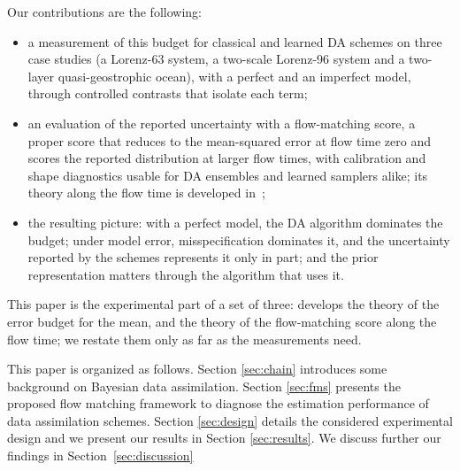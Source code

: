 Our contributions are the following:
\begin{itemize}[leftmargin=*,nosep]
  \item a measurement of this budget for classical and learned DA schemes on three case
    studies (a Lorenz-63 system, a two-scale Lorenz-96 system and a two-layer
    quasi-geostrophic ocean), with a perfect and an imperfect model, through controlled
    contrasts that isolate each term;
  \item an evaluation of the reported uncertainty with a flow-matching score, a proper
    score that reduces to the mean-squared error at flow time zero and scores the reported
    distribution at larger flow times, with calibration and shape diagnostics usable for DA
    ensembles and learned samplers alike; its theory along the flow time is developed
    in~\cite{fablet_flow_2026};
  \item the resulting picture: with a perfect model, the DA algorithm dominates the budget;
    under model error, misspecification dominates it, and the uncertainty reported by the
    schemes represents it only in part; and the prior representation matters through the
    algorithm that uses it.
\end{itemize}

This paper is the experimental part of a set of three: \cite{fablet_not_2026} develops the theory
of the error budget for the mean, and \cite{fablet_flow_2026} the theory of the flow-matching
score along the flow time; we restate them only as far as the measurements need.

This paper is organized as follows. Section \ref{sec:chain} introduces some background on Bayesian data assimilation. Section \ref{sec:fms} presents the proposed flow matching framework to diagnose the estimation performance of data assimilation schemes.  Section \ref{sec:design} details the considered experimental design and we present our results in Section \ref{sec:results}. We discuss further our findings in Section~\ref{sec:discussion} 